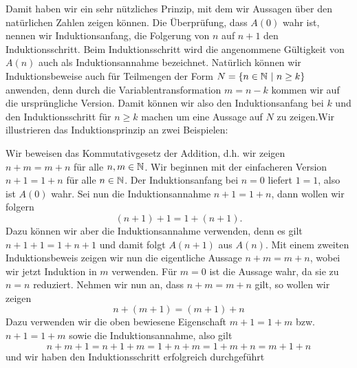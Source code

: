 Damit haben wir ein sehr nützliches Prinzip, mit dem wir Aussagen über den natürlichen Zahlen zeigen können. Die Überprüfung, dass \(A(0)\) wahr ist, nennen wir Induktionsanfang, die Folgerung von \(n\) auf \(n+1\) den Induktionsschritt. Beim Induktionsschritt wird die angenommene Gültigkeit von \(A(n)\) auch als Induktionsannahme bezeichnet. Natürlich können wir Induktionsbeweise auch für Teilmengen der Form \(N= \{n \in \mathbb{N}~|~n \geq k \}\)
anwenden, denn durch die Variablentransformation \(m=n-k\) kommen wir auf die ursprüngliche Version. Damit können wir also den Induktionsanfang bei \(k\) und den Induktionsschritt für \(n \geq k\) machen um eine Aussage auf \(N\) zu zeigen.Wir illustrieren das Induktionsprinzip an zwei Beispielen:
\label{grundlagen/zahlensysteme:example-2}
\begin{example}{}{}



Wir beweisen das Kommutativgesetz der Addition, d.h. wir zeigen \(n+m=m+n\) für alle \(n,m \in \mathbb{N}\). Wir beginnen mit der einfacheren Version \(n+1=1+n\) für alle \(n\in\mathbb{N}\). Der Induktionsanfang bei \(n=0\) liefert \(1=1\), also ist \(A(0)\) wahr. Sei nun die Induktionsannahme \(n+1=1+n\), dann wollen wir folgern
\begin{equation*}
 (n+1)+1=1+(n+1).
\end{equation*}
Dazu können wir aber die Induktionsannahme verwenden, denn es gilt \(n+1+1 = 1+n+1\) und damit folgt \(A(n+1)\) aus \(A(n)\).
Mit einem zweiten Induktionsbeweis zeigen wir nun die eigentliche Aussage \(n+m=m+n\), wobei wir jetzt Induktion in \(m\) verwenden. Für \(m=0\) ist die Aussage wahr, da sie zu \(n=n\) reduziert. Nehmen wir nun an, dass \(n+m=m+n\) gilt, so wollen wir zeigen
\begin{equation*}
 n+(m+1) = (m+1) + n
\end{equation*}
Dazu verwenden wir die oben bewiesene Eigenschaft \(m+1 =1+m\) bzw. \(n+1=1+m\) sowie die Induktionsannahme, also gilt
\begin{equation*}
 n+m+1=n+1+m=1+n+m=1+m+n=m+1+n
\end{equation*}
und wir haben den Induktionsschritt erfolgreich durchgeführt
\end{example}
\label{grundlagen/zahlensysteme:example-3}
